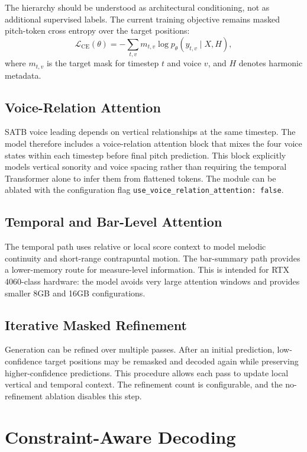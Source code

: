 \documentclass[11pt]{article}
\begin{document}
The hierarchy should be understood as architectural conditioning, not as additional supervised labels. The current training objective remains masked pitch-token cross entropy over the target positions:
\[
\mathcal{L}_{\mathrm{CE}}(\theta) =
- \sum_{t,v} m_{t,v}\log p_{\theta}(y_{t,v}\mid X,H),
\]
where $m_{t,v}$ is the target mask for timestep $t$ and voice $v$, and $H$ denotes harmonic metadata.

\subsection{Voice-Relation Attention}

SATB voice leading depends on vertical relationships at the same timestep. The model therefore includes a voice-relation attention block that mixes the four voice states within each timestep before final pitch prediction. This block explicitly models vertical sonority and voice spacing rather than requiring the temporal Transformer alone to infer them from flattened tokens. The module can be ablated with the configuration flag \texttt{use\_voice\_relation\_attention: false}.

\subsection{Temporal and Bar-Level Attention}

The temporal path uses relative or local score context to model melodic continuity and short-range contrapuntal motion. The bar-summary path provides a lower-memory route for measure-level information. This is intended for RTX 4060-class hardware: the model avoids very large attention windows and provides smaller 8GB and 16GB configurations.

\subsection{Iterative Masked Refinement}

Generation can be refined over multiple passes. After an initial prediction, low-confidence target positions may be remasked and decoded again while preserving higher-confidence predictions. This procedure allows each pass to update local vertical and temporal context. The refinement count is configurable, and the no-refinement ablation disables this step.

\section{Constraint-Aware Decoding}
\end{document}
